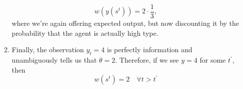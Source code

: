 \begin{enumerate}[label=\alph*)]
\begin{enumerate}
  \[
w(y(s^t)) = 2 \cdot \frac{1}{3},
\]
where we're again offering expected output, but now discounting it by the probability that the agent is actually high type.
\item Finally, the observation $y_t = 4$ is perfectly information and unambiguously tells us that $\theta =2$. Therefore, if we see $y = 4$ for some $t^\prime$, then
  \[
w(s^t) = 2 \quad \forall t > t^\prime
  \]
  \end{enumerate}
\end{enumerate}
